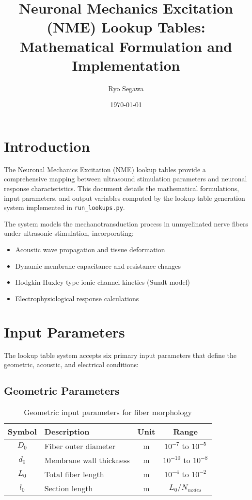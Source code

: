 \documentclass[11pt,a4paper]{article}
\title{Neuronal Mechanics Excitation (NME) Lookup Tables:\\Mathematical Formulation and Implementation}
\author{Ryo Segawa}
\date{\today}
\begin{document}
\maketitle

\tableofcontents
\newpage

\section{Introduction}

The Neuronal Mechanics Excitation (NME) lookup tables provide a comprehensive mapping between ultrasound stimulation parameters and neuronal response characteristics. This document details the mathematical formulations, input parameters, and output variables computed by the lookup table generation system implemented in \texttt{run\_lookups.py}.

The system models the mechanotransduction process in unmyelinated nerve fibers under ultrasonic stimulation, incorporating:
\begin{itemize}
    \item Acoustic wave propagation and tissue deformation
    \item Dynamic membrane capacitance and resistance changes
    \item Hodgkin-Huxley type ionic channel kinetics (Sundt model)
    \item Electrophysiological response calculations
\end{itemize}

\section{Input Parameters}

The lookup table system accepts six primary input parameters that define the geometric, acoustic, and electrical conditions:

\subsection{Geometric Parameters}

\begin{table}[h!]
\centering
\begin{tabular}{clcc}
\toprule
\textbf{Symbol} & \textbf{Description} & \textbf{Unit} & \textbf{Range} \\
\midrule
$D_0$ & Fiber outer diameter & m & $10^{-7}$ to $10^{-5}$ \\
$d_0$ & Membrane wall thickness & m & $10^{-10}$ to $10^{-8}$ \\
$L_0$ & Total fiber length & m & $10^{-4}$ to $10^{-2}$ \\
$l_0$ & Section length & m & $L_0/N_{nodes}$ \\
\bottomrule
\end{tabular}
\caption{Geometric input parameters for fiber morphology}
\end{table}
\end{document}

